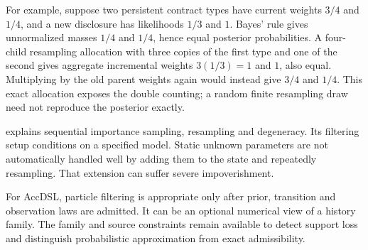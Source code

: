 For example, suppose two persistent contract types have current weights $3/4$ and $1/4$, and a new disclosure has likelihoods $1/3$ and $1$. Bayes' rule gives unnormalized masses $1/4$ and $1/4$, hence equal posterior probabilities. A four-child resampling allocation with three copies of the first type and one of the second gives aggregate incremental weights $3(1/3)=1$ and $1$, also equal. Multiplying by the old parent weights again would instead give $3/4$ and $1/4$. This exact allocation exposes the double counting; a random finite resampling draw need not reproduce the posterior exactly.

\citet[Sections 2--3]{doucet2012tutorial} explains sequential importance sampling, resampling and degeneracy. Its filtering setup conditions on a specified model. Static unknown parameters are not automatically handled well by adding them to the state and repeatedly resampling. That extension can suffer severe impoverishment.

For AccDSL, particle filtering is appropriate only after prior, transition and observation laws are admitted. It can be an optional numerical view of a history family. The family and source constraints remain available to detect support loss and distinguish probabilistic approximation from exact admissibility.
